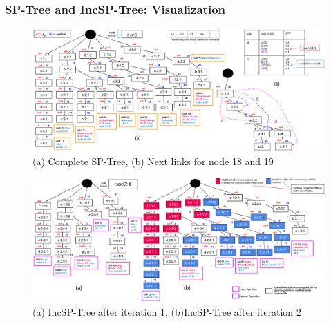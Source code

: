 %





%

\subsubsection{SP-Tree and IncSP-Tree: Visualization}


\begin{figure}[!htb]
\centering
\includegraphics[width=\textwidth]{Complete_SP_Tree_with_next_link}
\caption{(a) Complete SP-Tree, (b) Next links for node 18 and 19} \label{figure:complete_sp_Tree_with_next_link}
\end{figure}


\begin{figure}[!htb]
\centering
\includegraphics[width=\textwidth]{Complete_IncSP_Tree_with_next_link}
\caption{(a) IncSP-Tree after iteration 1, (b)IncSP-Tree after iteration 2} \label{figure:complete_inc_sp_Tree_with_with_two_pass}
\end{figure}


